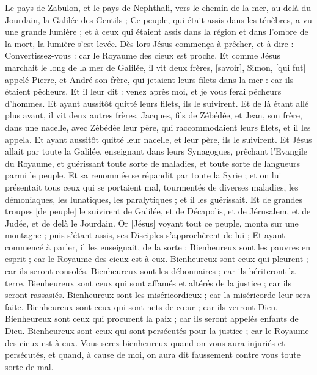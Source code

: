 \begin{multicols}{2}
Le pays de Zabulon, et le pays de Nephthali, vers le chemin de la mer, au-delà du Jourdain, la Galilée des Gentils ;
Ce peuple, qui était assis dans les ténèbres, a vu une grande lumière ; et à ceux qui étaient assis dans la région et dans l'ombre de la mort, la lumière s'est levée.
Dès lors Jésus commença à prêcher, et à dire : Convertissez-vous : car le Royaume des cieux est proche.
Et comme Jésus marchait le long de la mer de Galilée, il vit deux frères, [savoir], Simon, [qui fut] appelé Pierre, et André son frère, qui jetaient leurs filets dans la mer : car ils étaient pêcheurs.
Et il leur dit : venez après moi, et je vous ferai pêcheurs d'hommes.
Et ayant aussitôt quitté leurs filets, ils le suivirent.
Et de là étant allé plus avant, il vit deux autres frères, Jacques, fils de Zébédée, et Jean, son frère, dans une nacelle, avec Zébédée leur père, qui raccommodaient leurs filets, et il les appela.
Et ayant aussitôt quitté leur nacelle, et leur père, ils le suivirent.
Et Jésus allait par toute la Galilée, enseignant dans leurs Synagogues, prêchant l'Evangile du Royaume, et guérissant toute sorte de maladies, et toute sorte de langueurs parmi le peuple.
Et sa renommée se répandit par toute la Syrie ; et on lui présentait tous ceux qui se portaient mal, tourmentés de diverses maladies, les démoniaques, les lunatiques, les paralytiques ; et il les guérissait.
Et de grandes troupes [de peuple] le suivirent de Galilée, et de Décapolis, et de Jérusalem, et de Judée, et de delà le Jourdain.
\VerseOne{}Or [Jésus] voyant tout ce peuple, monta sur une montagne ; puis s'étant assis, ses Disciples s'approchèrent de lui ;
Et ayant commencé à parler, il les enseignait, de la sorte ;
Bienheureux sont les pauvres en esprit ; car le Royaume des cieux est à eux.
Bienheureux sont ceux qui pleurent ; car ils seront consolés.
Bienheureux sont les débonnaires ; car ils hériteront la terre.
Bienheureux sont ceux qui sont affamés et altérés de la justice ; car ils seront rassasiés.
Bienheureux sont les miséricordieux ; car la miséricorde leur sera faite.
Bienheureux sont ceux qui sont nets de cœur ; car ils verront Dieu.
Bienheureux sont ceux qui procurent la paix ; car ils seront appelés enfants de Dieu.
Bienheureux sont ceux qui sont persécutés pour la justice ; car le Royaume des cieux est à eux.
Vous serez bienheureux quand on vous aura injuriés et persécutés, et quand, à cause de moi, on aura dit faussement contre vous toute sorte de mal.

\end{multicols}
